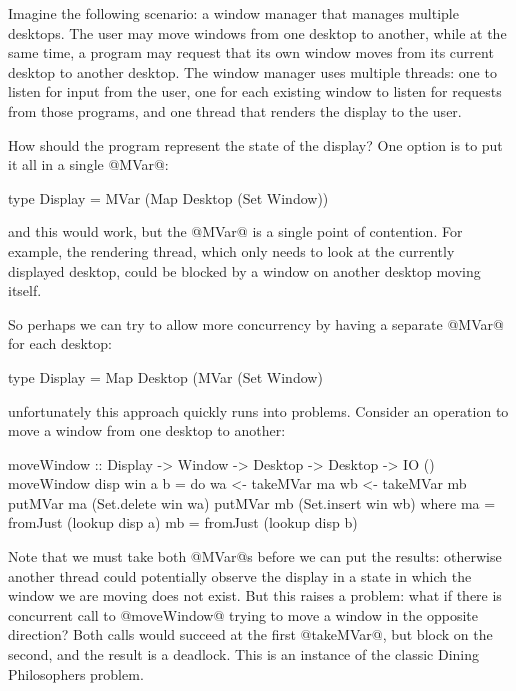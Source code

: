 Imagine the following scenario: a window manager that manages multiple
desktops.  The user may move windows from one desktop to another,
while at the same time, a program may request that its own window
moves from its current desktop to another desktop.  The window manager
uses multiple threads: one to listen for input from the user, one for
each existing window to listen for requests from those programs, and
one thread that renders the display to the user.

How should the program represent the state of the display?  One option
is to put it all in a single @MVar@:

\begin{haskell}
type Display = MVar (Map Desktop (Set Window))
\end{haskell}

\noindent and this would work, but the @MVar@ is a single point of
contention.  For example, the rendering thread, which only needs to
look at the currently displayed desktop, could be blocked by a window
on another desktop moving itself.

So perhaps we can try to allow more concurrency by having a separate
@MVar@ for each desktop:

\begin{haskell}
type Display = Map Desktop (MVar (Set Window)
\end{haskell}

\noindent unfortunately this approach quickly runs into problems.
Consider an operation to move a window from one desktop to another:

\begin{haskell}
moveWindow :: Display -> Window -> Desktop -> Desktop -> IO ()
moveWindow disp win a b = do
  wa <- takeMVar ma
  wb <- takeMVar mb
  putMVar ma (Set.delete win wa)
  putMVar mb (Set.insert win wb)
 where
  ma = fromJust (lookup disp a)
  mb = fromJust (lookup disp b)
\end{haskell}

\noindent Note that we must take both @MVar@s before we can put the
results: otherwise another thread could potentially observe the
display in a state in which the window we are moving does not exist.
But this raises a problem: what if there is concurrent call to
@moveWindow@ trying to move a window in the opposite direction?  Both
calls would succeed at the first @takeMVar@, but block on the second,
and the result is a deadlock.  This is an instance of the classic
Dining Philosophers problem. %

